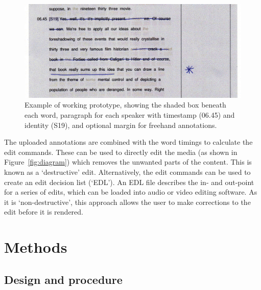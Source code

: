 \begin{figure}[h]
  \centering
  \includegraphics[width=\columnwidth]{figs/interface-darkened}
  \caption{Example of working prototype, showing the shaded box beneath each
    word, paragraph for each speaker with timestamp (06.45) and identity (S19),
    and optional margin for freehand annotations.}
  \label{fig:layout}
\end{figure}

The uploaded annotations are combined with the word timings to calculate the
edit commands.  These can be used to directly edit the media (as shown in
Figure~\ref{fig:diagram}) which removes the unwanted parts of the content. This
is known as a `destructive' edit.  Alternatively, the edit commands can be used
to create an edit decision list (`EDL'). An EDL file describes the in- and
out-point for a series of edits, which can be loaded into audio or video
editing software.  As it is `non-destructive', this approach allows the user to
make corrections to the edit before it is rendered. 


\section{Methods}

\subsection{Design and procedure}

